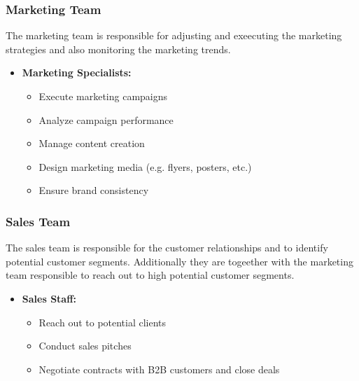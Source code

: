 \subsubsection*{Marketing Team}
The marketing team is responsible for adjusting and exeecuting the marketing strategies and also monitoring the marketing trends.
\begin{itemize}
    \item \textbf{Marketing Specialists:}
            \begin{itemize}
                \item Execute marketing campaigns
                \item Analyze campaign performance
                \item Manage content creation
                \item Design marketing media (e.g. flyers, posters, etc.)
                \item Ensure brand consistency
            \end{itemize}
\end{itemize}

\subsubsection*{Sales Team}
The sales team is responsible for the customer relationships and to identify potential customer segments.
Additionally they are togeether with the marketing team responsible to reach out to high potential customer segments.
\begin{itemize}
    \item \textbf{Sales Staff:}
            \begin{itemize}
                \item Reach out to potential clients
                \item Conduct sales pitches
                \item Negotiate contracts with B2B customers and close deals
            \end{itemize}
\end{itemize}

